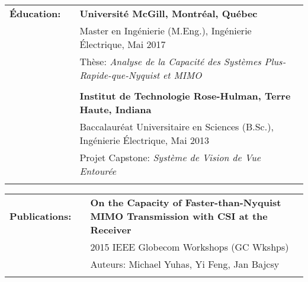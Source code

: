 \documentclass{minimal}
\begin{document}
\begin{tabular}{ p{1.5cm} p{1cm} p{16cm} }
\textbf{Éducation:} & & \textbf{Université McGill, Montréal, Québec} \\
& & Master en Ingénierie (M.Eng.), Ingénierie Électrique, Mai 2017\\
& & Thèse: \textit{Analyse de la Capacité des Systèmes Plus-Rapide-que-Nyquist et MIMO}\\
& & \\
& & \textbf{Institut de Technologie Rose-Hulman, Terre Haute, Indiana} \\
& & Baccalauréat Universitaire en Sciences (B.Sc.), Ingénierie Électrique, Mai 2013\\
& & Projet Capstone: \textit{Système de Vision de Vue Entourée}\\
& & \\
\end{tabular}

\begin{tabular}{ p{1.5cm} p{1cm} p{16cm} }
\textbf{Publications:} & & \textbf{On the Capacity of Faster-than-Nyquist MIMO Transmission with CSI at the Receiver}\\
& & 2015 IEEE Globecom Workshops (GC Wkshps)\\
& & Auteurs: Michael Yuhas, Yi Feng, Jan Bajcsy\\
& & \\
\end{tabular}
\end{document}
